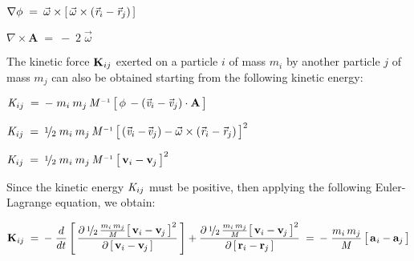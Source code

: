\documentclass[10pt]{article}
\newcommand{\med}{\raise.5ex\hbox{$\scriptstyle 1$}\kern-.15em/\kern-.09em\lower.25ex\hbox{$\scriptstyle 2$}}
\begin{document}
\par \bigskip $\nabla \phi \;=\: {\vec{\omega}} \times [ \, {\vec{\omega}} \times ({\vec{\mathit{r}}}_{i} - {\vec{\mathit{r}}}_{j}) \, ] \hspace{+0.06em}$

\par \bigskip $\nabla \times {\mathbf{A}} \;=\: - \; 2 \; {\vec{\omega}}$

\par \bigskip \noindent The kinetic force ${\mathbf{K}}_{\hspace{+0.009em}ij}$ exerted on a particle $i$ of mass $m_i$ by another particle $j$ of mass $m_j$ can also be obtained starting from the following kinetic energy:

\par \bigskip ${\mathit{K}}_{\hspace{+0.03em}ij} \;=\: - \; m_i \: m_j \, {\mathit{M}}^{\scriptscriptstyle -1} \, \big[ \, \phi \, - ({\vec{\mathit{v}}}_{i} - {\vec{\mathit{v}}}_{j}) \cdot {\mathbf{A}} \, \big]$

\par \bigskip ${\mathit{K}}_{\hspace{+0.03em}ij} \;=\: \med \; m_i \: m_j \, {\mathit{M}}^{\scriptscriptstyle -1} \, \big[ \, ({\vec{\mathit{v}}}_i - \hspace{-0.120em}{\vec{\mathit{v}}}_{j}) - {\vec{\omega}} \times ({\vec{\mathit{r}}}_i - {\vec{\mathit{r}}}_{j}) \, \big]^2$

\par \bigskip ${\mathit{K}}_{\hspace{+0.03em}ij} \;=\: \med \; m_i \: m_j \, {\mathit{M}}^{\scriptscriptstyle -1} \, \big[ \, {\mathbf{v}}_i - {\mathbf{v}}_{\hspace{-0.06em}j} \, \big]^2$

\vspace{+0.03em}

\par \bigskip \noindent Since the kinetic energy ${\mathit{K}}_{\hspace{+0.03em}ij}$ must be positive, then applying the following Euler-Lagrange equation, we obtain:

\vspace{+0.06em}

\par \bigskip ${\mathbf{K}}_{\hspace{+0.009em}ij} \;=\: - \; \dfrac{d}{dt} \, \Bigg[ \, \dfrac{\partial \, \med \, \frac{m_i \, m_j}{\mathit{M}} \big[ \, {\mathbf{v}}_i - {\mathbf{v}}_{\hspace{-0.06em}j} \, \big]^2}{\partial \, [ \, {\mathbf{v}}_i - {\mathbf{v}}_{\hspace{-0.06em}j} \, ]} \, \Bigg] + \dfrac{\partial \, \med \, \frac{m_i \, m_j}{\mathit{M}} \big[ \, {\mathbf{v}}_i - {\mathbf{v}}_{\hspace{-0.06em}j} \, \big]^2}{\partial \, [ \, {\mathbf{r}}_i - {\mathbf{r}}_{\hspace{-0.015em}j} \, ]} \;=\: - \; \dfrac{m_i \, m_j}{\mathit{M}} \, \big[ \, {\mathbf{a}}_{\hspace{+0.045em}i} - {\mathbf{a}}_{\hspace{-0.015em}j} \, \big]$
\end{document}
